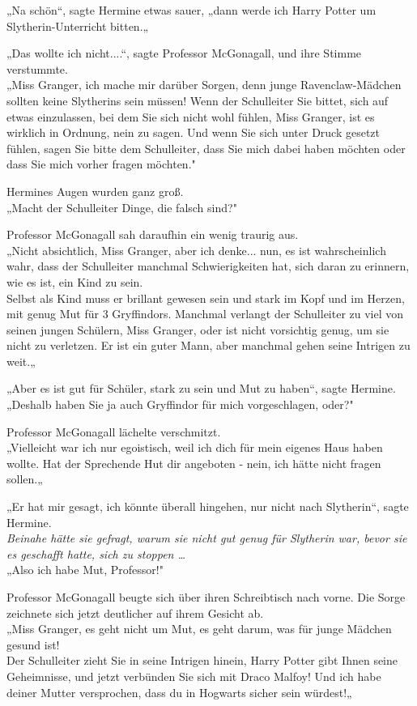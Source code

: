 {„Na schön“, sagte Hermine etwas sauer, „dann werde ich Harry Potter um Slytherin-Unterricht bitten.„

„Das wollte ich nicht....“, sagte Professor McGonagall, und ihre Stimme verstummte.\\ „Miss Granger, ich mache mir darüber Sorgen, denn junge Ravenclaw-Mädchen sollten keine Slytherins sein müssen! Wenn der Schulleiter Sie bittet, sich auf etwas einzulassen, bei dem Sie sich nicht wohl fühlen, Miss Granger, ist es wirklich in Ordnung, nein zu sagen. Und wenn Sie sich unter Druck gesetzt fühlen, sagen Sie bitte dem Schulleiter, dass Sie mich dabei haben möchten oder dass Sie mich vorher fragen möchten."

Hermines Augen wurden ganz groß.\\ „Macht der Schulleiter Dinge, die falsch sind?"

Professor McGonagall sah daraufhin ein wenig traurig aus.\\ „Nicht absichtlich, Miss Granger, aber ich denke... nun, es ist wahrscheinlich wahr, dass der Schulleiter manchmal Schwierigkeiten hat, sich daran zu erinnern, wie es ist, ein Kind zu sein.\\ Selbst als Kind muss er brillant gewesen sein und stark im Kopf und im Herzen, mit genug Mut für 3 Gryffindors. Manchmal verlangt der Schulleiter zu viel von seinen jungen Schülern, Miss Granger, oder ist nicht vorsichtig genug, um sie nicht zu verletzen. Er ist ein guter Mann, aber manchmal gehen seine Intrigen zu weit.„

„Aber es ist gut für Schüler, stark zu sein und Mut zu haben“, sagte Hermine.\\ „Deshalb haben Sie ja auch Gryffindor für mich vorgeschlagen, oder?"

Professor McGonagall lächelte verschmitzt.\\ „Vielleicht war ich nur egoistisch, weil ich dich für mein eigenes Haus haben wollte. Hat der Sprechende Hut dir angeboten - nein, ich hätte nicht fragen sollen.„

„Er hat mir gesagt, ich könnte überall hingehen, nur nicht nach Slytherin“, sagte Hermine.\\ \emph{Beinahe hätte sie gefragt, warum sie nicht gut genug für Slytherin war, bevor sie es geschafft hatte, sich zu stoppen …}\\ „Also ich habe Mut, Professor!"

Professor McGonagall beugte sich über ihren Schreibtisch nach vorne. Die Sorge zeichnete sich jetzt deutlicher auf ihrem Gesicht ab.\\ „Miss Granger, es geht nicht um Mut, es geht darum, was für junge Mädchen gesund ist!\\ Der Schulleiter zieht Sie in seine Intrigen hinein, Harry Potter gibt Ihnen seine Geheimnisse, und jetzt verbünden Sie sich mit Draco Malfoy! Und ich habe deiner Mutter versprochen, dass du in Hogwarts sicher sein würdest!„

}
